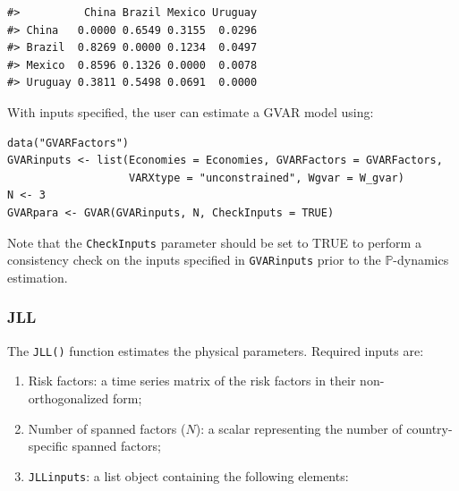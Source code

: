 \begin{verbatim}
#>          China Brazil Mexico Uruguay
#> China   0.0000 0.6549 0.3155  0.0296
#> Brazil  0.8269 0.0000 0.1234  0.0497
#> Mexico  0.8596 0.1326 0.0000  0.0078
#> Uruguay 0.3811 0.5498 0.0691  0.0000
\end{verbatim}

With inputs specified, the user can estimate a GVAR model using:

\begin{verbatim}
data("GVARFactors")
GVARinputs <- list(Economies = Economies, GVARFactors = GVARFactors,
                   VARXtype = "unconstrained", Wgvar = W_gvar)
N <- 3
GVARpara <- GVAR(GVARinputs, N, CheckInputs = TRUE)
\end{verbatim}

Note that the \texttt{CheckInputs} parameter should be set to TRUE to perform a consistency check on the inputs specified in \texttt{GVARinputs} prior to the \(\mathbb{P}\)-dynamics estimation.

\subsubsection{JLL}\label{S:SectionJLL}

The \texttt{JLL()} function estimates the physical parameters. Required inputs are:

\begin{enumerate}
\def\labelenumi{\arabic{enumi}.}
\item
  Risk factors: a time series matrix of the risk factors in their non-orthogonalized form;
\item
  Number of spanned factors (\(N\)): a scalar representing the number of country-specific spanned factors;
\item
  \texttt{JLLinputs}: a list object containing the following elements:
\end{enumerate}

